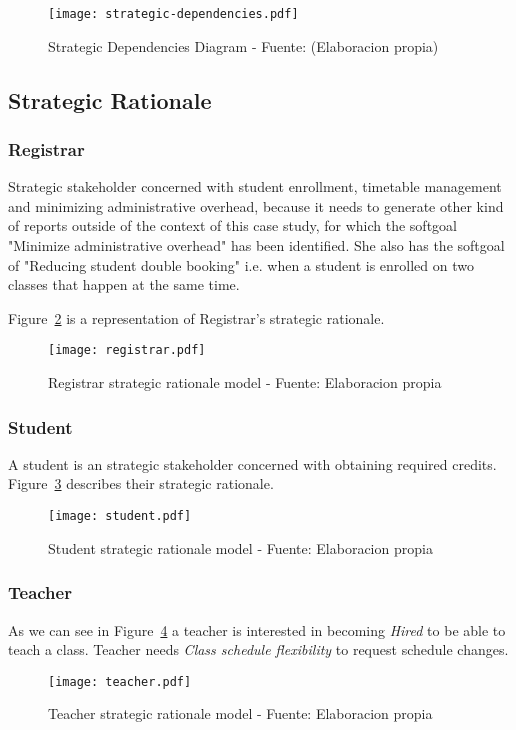 \begin{figure}
	\caption{Strategic Dependencies Diagram - Fuente: (Elaboracion propia)}\label{fig:strategicDependenciesDiagram}
	\centering
	\texttt{[image: strategic-dependencies.pdf]}
\end{figure}

\subsection{Strategic Rationale}
\subsubsection{Registrar}
Strategic stakeholder concerned with student enrollment, timetable management and minimizing administrative overhead, because it needs to generate other kind of reports outside of the context of this case study, for which the softgoal "Minimize administrative overhead" has been identified.
She also has the softgoal of "Reducing student double booking" i.e. when a student is enrolled on two classes that happen at the same time.

Figure~\ref{fig:actorBoundaryRegistrar} is a representation of Registrar's strategic rationale.

\begin{landscape}
	\begin{figure}
		\centering
		\caption{Registrar strategic rationale model - Fuente: Elaboracion propia}
		\texttt{[image: registrar.pdf]}
		\label{fig:actorBoundaryRegistrar}
	\end{figure}
\end{landscape}

\subsubsection{Student}
A student is an strategic stakeholder concerned with obtaining required credits.
Figure~\ref{fig:actorBoundaryStudent} describes their strategic rationale.
\begin{figure}
	\centering
	\caption{Student strategic rationale model - Fuente: Elaboracion propia}
	\texttt{[image: student.pdf]}
	\label{fig:actorBoundaryStudent}
\end{figure}

\subsubsection{Teacher}
As we can see in Figure~\ref{fig:actorBoundaryTeacher} a teacher is interested in becoming \textit{Hired} to be able to teach a class.
Teacher needs \textit{Class schedule flexibility} to request schedule changes.

\begin{figure}
	\centering
	\caption{Teacher strategic rationale model - Fuente: Elaboracion propia}
	\label{fig:actorBoundaryTeacher}
	\texttt{[image: teacher.pdf]}
\end{figure}

